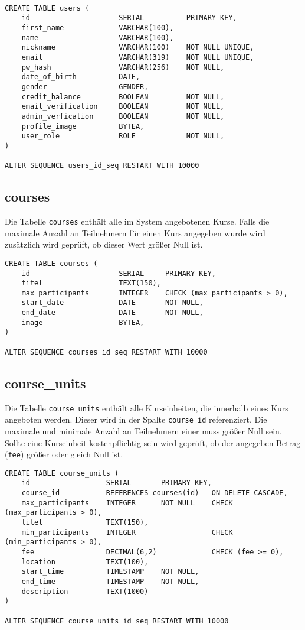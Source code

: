 \begin{verbatim}

CREATE TABLE users (
    id                     SERIAL          PRIMARY KEY,
    first_name             VARCHAR(100),
    name                   VARCHAR(100),
    nickname               VARCHAR(100)    NOT NULL UNIQUE,
    email                  VARCHAR(319)    NOT NULL UNIQUE,
    pw_hash                VARCHAR(256)    NOT NULL,
    date_of_birth          DATE,
    gender                 GENDER,
    credit_balance         BOOLEAN         NOT NULL,
    email_verification     BOOLEAN         NOT NULL,
    admin_verfication      BOOLEAN         NOT NULL,
    profile_image          BYTEA,
    user_role              ROLE            NOT NULL,
)

ALTER SEQUENCE users_id_seq RESTART WITH 10000
\end{verbatim}

\subsection{courses}
Die Tabelle \texttt{courses} enthält alle im System angebotenen Kurse. Falls die maximale Anzahl an Teilnehmern für einen Kurs angegeben wurde wird zusätzlich wird geprüft, ob dieser Wert größer Null ist.

\begin{verbatim}
CREATE TABLE courses (
    id                     SERIAL     PRIMARY KEY,
    titel                  TEXT(150),
    max_participants       INTEGER    CHECK (max_participants > 0),
    start_date             DATE       NOT NULL,
    end_date               DATE       NOT NULL,
    image                  BYTEA,
)

ALTER SEQUENCE courses_id_seq RESTART WITH 10000
\end{verbatim}

\subsection{course\_units}
Die Tabelle \texttt{course\_units} enthält alle Kurseinheiten, die innerhalb eines Kurs angeboten werden. Dieser wird in der Spalte \texttt{course\_id} referenziert. Die maximale und minimale Anzahl an Teilnehmern einer muss größer Null sein. Sollte eine Kurseinheit kostenpflichtig sein wird geprüft, ob der angegeben Betrag (\texttt{fee}) größer oder gleich Null ist.

\begin{verbatim}
CREATE TABLE course_units (
    id                  SERIAL       PRIMARY KEY,
    course_id           REFERENCES courses(id)   ON DELETE CASCADE,
    max_participants    INTEGER      NOT NULL    CHECK (max_participants > 0),
    titel               TEXT(150),
    min_participants    INTEGER                  CHECK (min_participants > 0),
    fee                 DECIMAL(6,2)             CHECK (fee >= 0),
    location            TEXT(100),
    start_time          TIMESTAMP    NOT NULL,
    end_time            TIMESTAMP    NOT NULL,
    description         TEXT(1000)
)

ALTER SEQUENCE course_units_id_seq RESTART WITH 10000
\end{verbatim}

